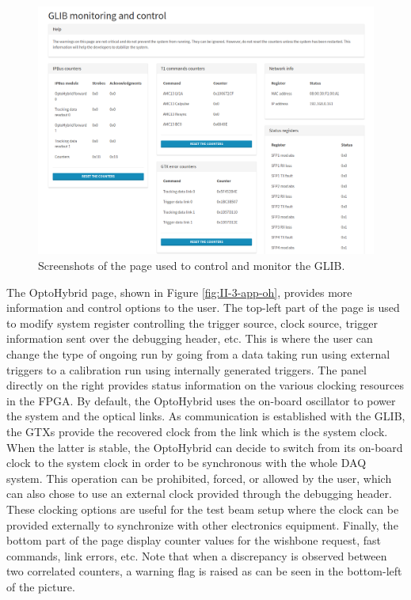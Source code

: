       \begin{figure}[h!]
        \centering
        \includegraphics[width=\textwidth]{img/II-3-test-beam/app-glib.png}
        \caption{Screenshots of the page used to control and monitor the GLIB.}
        \label{fig:II-3-app-glib}
      \end{figure}

      The OptoHybrid page, shown in Figure \ref{fig:II-3-app-oh}, provides more information and control options to the user. The top-left part of the page is used to modify system register controlling the trigger source, clock source, trigger information sent over the debugging header, etc. This is where the user can change the type of ongoing run by going from a data taking run using external triggers to a calibration run using internally generated triggers. The panel directly on the right provides status information on the various clocking resources in the FPGA. By default, the OptoHybrid uses the on-board oscillator to power the system and the optical links. As communication is established with the GLIB, the GTXs provide the recovered clock from the link which is the system clock. When the latter is stable, the OptoHybrid can decide to switch from its on-board clock to the system clock in order to be synchronous with the whole DAQ system. This operation can be prohibited, forced, or allowed by the user, which can also chose to use an external clock provided through the debugging header. These clocking options are useful for the test beam setup where the clock can be provided externally to synchronize with other electronics equipment. Finally, the bottom part of the page display counter values for the wishbone request, fast commands, link errors, etc. Note that when a discrepancy is observed between two correlated counters, a warning flag is raised as can be seen in the bottom-left of the picture. \\

